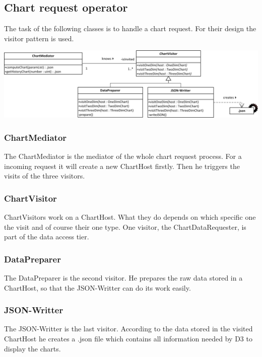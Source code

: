 \subsection{Chart request operator}
The task of the following classes is to handle a chart request. For their design the visitor pattern
is used. 

\begin{center}
\includegraphics[width=1\linewidth]{Pictures/Parts/MediVisi.png}
\end{center}  

\subsubsection*{ChartMediator}
The ChartMediator is the mediator of the whole chart request process. For a incoming request it will create a new
ChartHost firstly. Then he triggers the visits of the three visitors. 


\subsubsection*{ChartVisitor}
ChartVisitors work on a ChartHost. What they do depends on which specific one the visit and of course their
one type. One visitor, the ChartDataRequester, is part of the data access tier.


\subsubsection*{DataPreparer}
The DataPreparer is the second visitor. He prepares the raw data stored in a ChartHost, so that the JSON-Writter
can do its work easily.


\subsubsection*{JSON-Writter}
The JSON-Writter is the last visitor. According to the data stored in the visited ChartHost he creates a .json file
which contains all information needed by D3 to display the charts. 

